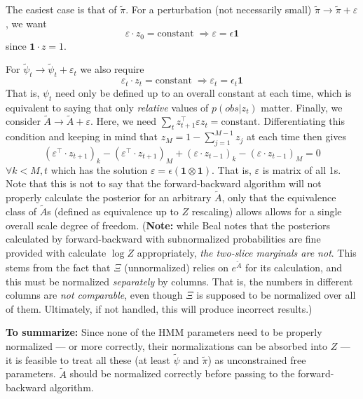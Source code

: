 \documentclass[11pt]{article}
\begin{document}
The easiest case is that of $\tilde{\pi}$. For a perturbation (not necessarily small) $\tilde{\pi} \rightarrow \tilde{\pi} + \varepsilon$, we want
\begin{equation}
    \varepsilon \cdot z_0 = \text{constant} \; \Rightarrow \varepsilon = \epsilon \mathbf{1}
\end{equation}
since $\mathbf{1} \cdot z = 1$.

For $\tilde{\psi}_t \rightarrow \tilde{\psi}_t + \varepsilon_t$ we also require
\begin{equation}
    \varepsilon_t \cdot z_t = \text{constant} \; \Rightarrow \varepsilon_t = \epsilon_t \mathbf{1}
\end{equation}
That is, $\psi_t$ need only be defined up to an overall constant at each time, which is equivalent to saying that only \emph{relative} values of $p(obs|z_t)$ matter.
Finally, we consider $\tilde{A} \rightarrow \tilde{A} + \varepsilon$. Here, we need $\sum_t z^\top_{t + 1} \varepsilon z_t = \text{constant}$. Differentiating this condition and keeping in mind that $z_M = 1 - \sum_{j = 1}^{M - 1} z_j$ at each time then gives
\begin{equation}
    (\varepsilon^\top \cdot z_{t + 1})_k
    - (\varepsilon^\top \cdot z_{t + 1})_M
    + (\varepsilon \cdot z_{t - 1})_k
    - (\varepsilon \cdot z_{t - 1})_M
    = 0
\end{equation}
$\forall k < M, t$ which has the solution $\varepsilon = \epsilon(\mathbf{1} \otimes \mathbf{1})$. That is, $\varepsilon$ is matrix of all 1s. Note that this is not to say that the forward-backward algorithm will not properly calculate the posterior for an arbitrary $\tilde{A}$, only that the equivalence class of $\tilde{A}$s (defined as equivalence up to $Z$ rescaling) allows allows for a single overall scale degree of freedom. ({\bf Note:} while Beal notes that the posteriors calculated by forward-backward with subnormalized probabilities are fine provided with calculate $\log Z$ appropriately, \emph{the two-slice marginals are not}. This stems from the fact that $\Xi$ (unnormalized) relies on $e^{\tilde{A}}$ for its calculation, and this must be normalized \emph{separately} by columns. That is, the numbers in different columns are \emph{not comparable}, even though $\Xi$ is supposed to be normalized over all of them. Ultimately, if not handled, this will produce incorrect results.)

{\bf To summarize:} Since none of the HMM parameters need to be properly normalized --- or more correctly, their normalizations can be absorbed into $Z$ --- it is feasible to treat all these (at least $\tilde{\psi}$ and $\tilde{\pi}$) as unconstrained free parameters. $\tilde{A}$ should be normalized correctly before passing to the forward-backward algorithm.
\end{document}
